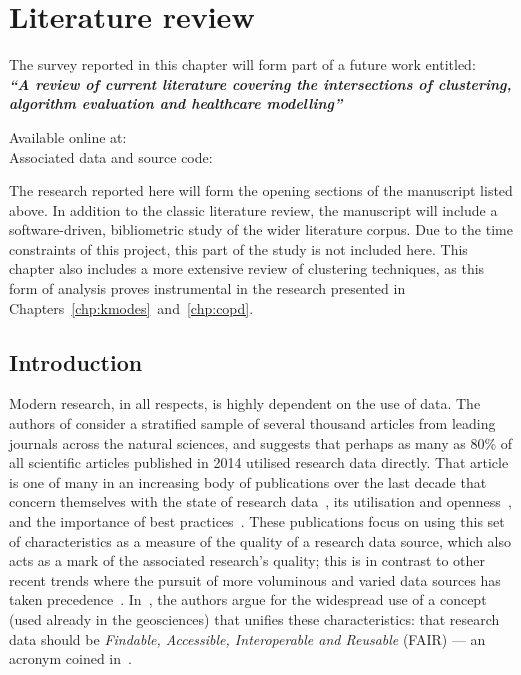 \chapter{Literature review}
\label{chp:lit}

\begin{center}
    The survey reported in this chapter will form part of a future work
    entitled:\\[1em]

    {%
        \bf\itshape{``A review of current literature covering the intersections
        of clustering, algorithm evaluation and healthcare modelling''}
    }

    Available online at:~\\
    Associated data and source code:~\\[1em]
\end{center}

\myrule%

The research reported here will form the opening sections of the manuscript
listed above. In addition to the classic literature review, the
manuscript will include a software-driven, bibliometric study of the wider
literature corpus. Due to the time constraints of this project, this part of the
study is not included here. This chapter also includes a more extensive review
of clustering techniques, as this form of analysis proves instrumental in the
research presented in Chapters~\ref{chp:kmodes}~and~\ref{chp:copd}.

\section{Introduction}

Modern research, in all respects, is highly dependent on the use of data. The
authors of \cite{Womack2015} consider a stratified sample of several thousand
articles from leading journals across the natural sciences, and suggests that
perhaps as many as 80\% of all scientific articles published in 2014 utilised
research data directly. That article is one of many in an increasing body of
publications over the last decade that concern themselves with the state of
research data~\cite{Higman2019}, its utilisation and
openness~\cite{Aslam2017,Zuiderwijk2020}, and the importance of best
practices~\cite{Colavizza2020,Corti2019}. These publications focus on using this
set of characteristics as a measure of the quality of a research data source,
which also acts as a mark of the associated research's quality; this is in
contrast to other recent trends where the pursuit of more voluminous and varied
data sources has taken precedence~\cite{Batistic2019}. In~\cite{Stall2019}, the
authors argue for the widespread use of a concept (used already in the
geosciences) that unifies these characteristics: that research data should be
\emph{Findable, Accessible, Interoperable and Reusable} (FAIR) --- an acronym
coined in~\cite{Wilkinson2016}.

